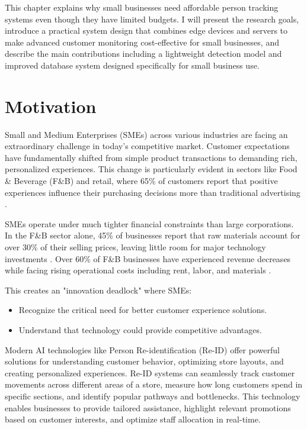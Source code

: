 \documentclass[../main.tex]{subfiles}
\begin{document}
This chapter explains why small businesses need affordable person tracking systems even though they have limited budgets. I will present the research goals, introduce a practical system design that combines edge devices and servers to make advanced customer monitoring cost-effective for small businesses, and describe the main contributions including a lightweight detection model and improved database system designed specifically for small business use.


\section{Motivation}
\label{sec:motivation}

Small and Medium Enterprises (SMEs) across various industries are facing an extraordinary challenge in today's competitive market. Customer expectations have fundamentally shifted from simple product transactions to demanding rich, personalized experiences. This change is particularly evident in sectors like Food \& Beverage (F\&B) and retail, where 65\% of customers report that positive experiences influence their purchasing decisions more than traditional advertising \cite{customer_experience}.

SMEs operate under much tighter financial constraints than large corporations. In the F\&B sector alone, 45\% of businesses report that raw materials account for over 30\% of their selling prices, leaving little room for major technology investments \cite{customer_experience2}. Over 60\% of F\&B businesses have experienced revenue decreases while facing rising operational costs including rent, labor, and materials \cite{customer_experience3}.

This creates an "innovation deadlock" where SMEs:
\begin{itemize}
    \item Recognize the critical need for better customer experience solutions.
    \item Understand that technology could provide competitive advantages.
\end{itemize}

Modern AI technologies like Person Re-identification (Re-ID) offer powerful solutions for understanding customer behavior, optimizing store layouts, and creating personalized experiences. Re-ID systems can seamlessly track customer movements across different areas of a store, measure how long customers spend in specific sections, and identify popular pathways and bottlenecks. This technology enables businesses to provide tailored assistance, highlight relevant promotions based on customer interests, and optimize staff allocation in real-time.
\end{document}
